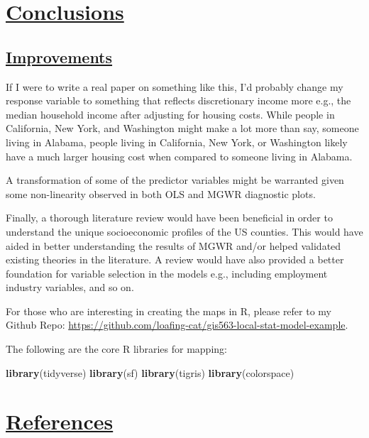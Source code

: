 \documentclass[
]{article}
\newenvironment{Shaded}{\begin{snugshade}}{\end{snugshade}}
\newcommand{\FunctionTok}[1]{\textcolor[rgb]{0.13,0.29,0.53}{\textbf{#1}}}
\newcommand{\NormalTok}[1]{#1}
\begin{document}
\newpage

\section{\texorpdfstring{\ul{Conclusions}}{Conclusions}}\label{conclusions}

\subsection{\texorpdfstring{\ul{Improvements}}{Improvements}}\label{improvements}

If I were to write a real paper on something like this, I'd probably
change my response variable to something that reflects discretionary
income more e.g., the median household income after adjusting for
housing costs. While people in California, New York, and Washington
might make a lot more than say, someone living in Alabama, people living
in California, New York, or Washington likely have a much larger housing
cost when compared to someone living in Alabama.

A transformation of some of the predictor variables might be warranted
given some non-linearity observed in both OLS and MGWR diagnostic plots.

Finally, a thorough literature review would have been beneficial in
order to understand the unique socioeconomic profiles of the US
counties. This would have aided in better understanding the results of
MGWR and/or helped validated existing theories in the literature. A
review would have also provided a better foundation for variable
selection in the models e.g., including employment industry variables,
and so on.

For those who are interesting in creating the maps in R, please refer to
my Github Repo:
\url{https://github.com/loafing-cat/gis563-local-stat-model-example}.

The following are the core R libraries for mapping:

\begin{Shaded}
\begin{Highlighting}[]
\FunctionTok{library}\NormalTok{(tidyverse)}
\FunctionTok{library}\NormalTok{(sf)}
\FunctionTok{library}\NormalTok{(tigris)}
\FunctionTok{library}\NormalTok{(colorspace)}
\end{Highlighting}
\end{Shaded}

\newpage

\section{\texorpdfstring{\ul{References}}{References}}\label{references}
\end{document}
